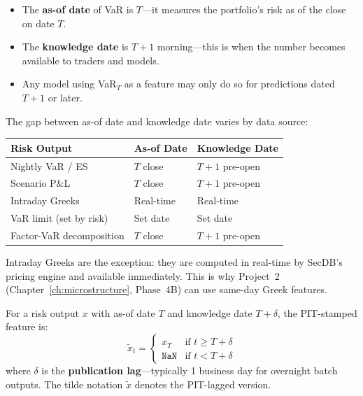 \begin{itemize}[nosep]
  \item The \textbf{as-of date} of VaR is $T$---it measures the
        portfolio's risk as of the close on date $T$.
  \item The \textbf{knowledge date} is $T+1$ morning---this is when the
        number becomes available to traders and models.
  \item Any model using VaR$_T$ as a feature may only do so for
        predictions dated $T+1$ or later.
\end{itemize}

The gap between as-of date and knowledge date varies by data source:

\begin{center}
\small
\begin{tabular}{@{}lll@{}}
\toprule
\textbf{Risk Output} & \textbf{As-of Date} & \textbf{Knowledge Date} \\
\midrule
Nightly VaR / ES          & $T$ close  & $T+1$ pre-open \\
Scenario P\&L              & $T$ close  & $T+1$ pre-open \\
Intraday Greeks            & Real-time  & Real-time \\
VaR limit (set by risk)    & Set date   & Set date \\
Factor-VaR decomposition   & $T$ close  & $T+1$ pre-open \\
\bottomrule
\end{tabular}
\end{center}

\noindent Intraday Greeks are the exception: they are computed in
real-time by SecDB's pricing engine and available immediately.  This is
why Project~2 (Chapter~\ref{ch:microstructure}, Phase~4B) can use
same-day Greek features.

\begin{definition}
For a risk output $x$ with as-of date $T$ and knowledge date $T+\delta$,
the PIT-stamped feature is:
\begin{equation}
\label{eq:pit}
\tilde{x}_t =
\begin{cases}
x_T & \text{if } t \ge T + \delta \\
\texttt{NaN} & \text{if } t < T + \delta
\end{cases}
\end{equation}
where $\delta$ is the \textbf{publication lag}---typically 1 business day
for overnight batch outputs.  The tilde notation $\tilde{x}$ denotes the
PIT-lagged version.
\end{definition}

